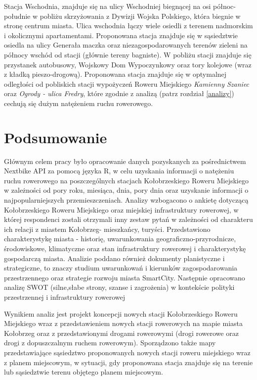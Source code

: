 \documentclass{amuthesis}
\begin{document}
Stacja Wschodnia, znajduje się na ulicy Wschodniej biegnącej na osi północ-południe w pobliżu skrzyżowania z Dywizji Wojska Polskiego, która biegnie w stronę centrum miasta.
Ulica wschodnia łączy wiele osiedli z terenem nadmorskim i okolicznymi apartamentami. Proponowana stacja znajduje się w sąsiedztwie osiedla na ulicy Generała maczka oraz niezagospodarowanych terenów zieleni na północy wschód od stacji (głównie tereny bagniste).
W pobliżu stacji znajduje się przystanek autobusowy, Wojskowy Dom Wypoczynkowy oraz tory kolejowe (wraz z kładką pieszo-drogową).
Proponowana stacja znajduje się w optymalnej odległości od pobliskich stacji wypożyczeń Roweru Miejskiego \emph{Kamienny Szaniec} oraz \emph{Ogrody - ulica Fredry}, które zgodnie z analizą (patrz rozdział \ref{analizy}) cechują się dużym natężeniem ruchu rowerowego.

\hypertarget{podsumowanie}{%
\chapter{Podsumowanie}\label{podsumowanie}}

Głównym celem pracy było opracowanie danych pozyskanych za pośrednictwem Nextbike API za pomocą języka R, w celu uzyskania informacji o natężeniu ruchu rowerowego na poszczególnych stacjach Kołobrzeskiego Roweru Miejskiego w zależności od pory roku, miesiąca, dnia, pory dnia oraz uzyskanie informacji o najpopularniejszych przemieszczeniach.
Analizy wzbogacono o ankietę dotyczącą Kołobrzeskiego Roweru Miejskiego oraz miejskiej infrastruktury rowerowej, w której respondenci zostali otrzymali inny zestaw pytań w zależności od charakteru ich relacji z miastem Kołobrzeg- mieszkańcy, turyści.
Przedstawiono charakterystykę miasta - historię, uwarunkowania geograficzno-przyrodnicze, środowiskowe, klimatyczne oraz stan infrastruktury rowerowej i charakterystykę gospodarczą miasta.
Analizie poddano również dokumenty planistyczne i strategiczne, to znaczy studium uwarunkowań i kierunków zagospodarowania przestrzennego oraz strategie rozwoju miasta SmartCity.
Następnie opracowano analizę SWOT (silne,słabe strony, szanse i zagrożenia) w kontekście polityki przestrzennej i infrastruktury rowerowej

Wynikiem analiz jest projekt koncepcji nowych stacji Kołobrzeskiego Roweru Miejskiego wraz z
przedstawieniem nowych stacji rowerowych na mapie miasta Kołobrzeg oraz z przedstawionymi drogami rowerowymi (drogi rowerowe oraz drogi z dopuszczalnym ruchem rowerowym).
Sporządzono także mapy przedstawiające sąsiedztwo proponowanych nowych stacji roweru miejskiego wraz z planem miejscowym, w sytuacji, gdy proponowana stacja znajduje się na terenie lub sąsiedztwie terenu objętego planem miejscowym.

\printbibliography[heading=bibintoc, title=Bibliografia]
\end{document}
